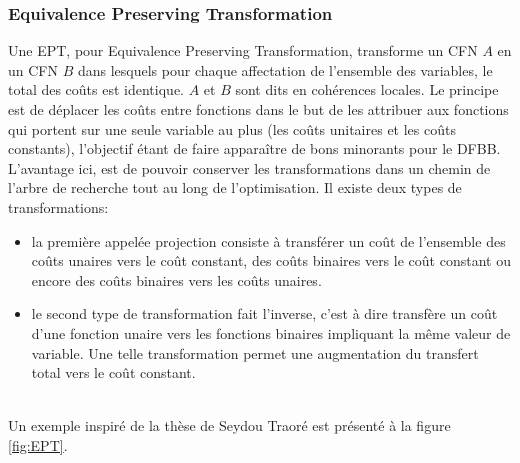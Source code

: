 \subsubsection{Equivalence Preserving Transformation}
Une EPT, pour \og Equivalence Preserving Transformation\fg, transforme un CFN $A$ en un CFN $B$ dans lesquels pour chaque affectation de l'ensemble des variables, le total des coûts  est identique. $A$ et $B$ sont dits en cohérences locales. Le principe est de déplacer les coûts entre fonctions dans le but de les attribuer aux fonctions qui portent sur une seule variable au plus (les coûts unitaires et les coûts constants), l'objectif étant de faire apparaître de bons minorants \cite{schiex00} pour le DFBB. L'avantage ici, est de pouvoir conserver les transformations dans un chemin de l'arbre de recherche tout au long de l'optimisation. Il existe deux types de transformations:
\begin{itemize}
\item la première appelée projection consiste à transférer un coût de l'ensemble des coûts unaires vers le coût constant, des coûts binaires vers le coût constant ou encore des coûts binaires vers les coûts unaires.
\item le second type de transformation fait l'inverse, c'est à dire transfère un coût d'une fonction unaire vers les fonctions binaires impliquant la même valeur de variable. Une telle transformation permet une augmentation du transfert total vers le coût constant.
\end{itemize}\\
Un exemple inspiré de la thèse de Seydou Traoré est présenté à  la figure \ref{fig:EPT}.

